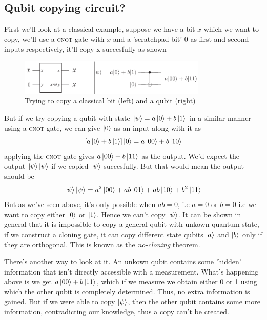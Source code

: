 \subsection{Qubit copying circuit?}
First we'll look at a classical example, suppose we have a bit $x$ which we want to copy, we'll use a \textsc{cnot} gate with $x$ and a 'scratchpad bit' 0 as first and second inputs respectively, it'll copy x succesfully as shown
\begin{figure}[H]
    \centering
    \includegraphics[width=0.8\textwidth]{images/qubit_copy.png}
    \caption{Trying to copy a classical bit (left) and a qubit (right)}
    \label{fig:qubit-copy}
\end{figure}
But if we try copying a qubit with state $\ket{\psi} = a\ket{0} + b\ket{1}$ in a similar manner using a \textsc{cnot} gate, we can give $\ket{0}$ as an input along with it as
\begin{equation}
    \left[ a\ket{0} + b\ket{1} \right]\ket{0} = a\ket{00} + b\ket{10}
\end{equation}
applying the \textsc{cnot} gate gives $a\ket{00} + b\ket{11}$ as the output. We'd expect the output $\ket{\psi}\ket{\psi}$ if we copied $\ket{\psi}$ succesfully. But that would mean the output should be
\begin{equation}
    \ket{\psi}\ket{\psi} = a^2\ket{00} + ab\ket{01} + ab\ket{10} + b^2\ket{11}
\end{equation}
But as we've seen above, it's only possible when $ab = 0$, i.e $a=0$ or $b=0$ i.e we want to copy either $\ket{0}$ or $\ket{1}$. Hence we can't copy $\ket{\psi}$. It can be shown in general that it is impossible to copy a general qubit with unkown quantum state, if we construct a cloning gate, it can copy different state qubits $\ket{a}$ and $\ket{b}$ only if they are orthogonal. This is known as the \textit{no-cloning} theorem.

There's another way to look at it. An unkown qubit contains some 'hidden' information that isn't directly accessible with a measurement. What's happening above is we get $a\ket{00} + b\ket{11}$, which if we measure we obtain either 0 or 1 using which the other qubit is completely determined. Thus, no extra information is gained. But if we were able to copy $\ket{\psi}$, then the other qubit contains some more information, contradicting our knowledge, thus a copy can't be created.

